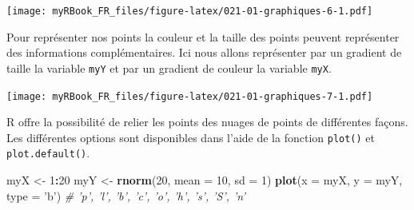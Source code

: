 \documentclass[]{book}
\newenvironment{Shaded}{\begin{snugshade}}{\end{snugshade}}
\newcommand{\CommentTok}[1]{\textcolor[rgb]{0.56,0.35,0.01}{\textit{#1}}}
\newcommand{\DataTypeTok}[1]{\textcolor[rgb]{0.13,0.29,0.53}{#1}}
\newcommand{\DecValTok}[1]{\textcolor[rgb]{0.00,0.00,0.81}{#1}}
\newcommand{\FloatTok}[1]{\textcolor[rgb]{0.00,0.00,0.81}{#1}}
\newcommand{\KeywordTok}[1]{\textcolor[rgb]{0.13,0.29,0.53}{\textbf{#1}}}
\newcommand{\NormalTok}[1]{#1}
\newcommand{\OperatorTok}[1]{\textcolor[rgb]{0.81,0.36,0.00}{\textbf{#1}}}
\newcommand{\StringTok}[1]{\textcolor[rgb]{0.31,0.60,0.02}{#1}}
\begin{document}
\texttt{[image: myRBook\_FR\_files/figure-latex/021-01-graphiques-6-1.pdf]}

Pour représenter nos points la couleur et la taille des points peuvent représenter des informations complémentaires. Ici nous allons représenter par un gradient de taille la variable \texttt{myY} et par un gradient de couleur la variable \texttt{myX}.

\begin{Shaded}
\end{Shaded}

\texttt{[image: myRBook\_FR\_files/figure-latex/021-01-graphiques-7-1.pdf]}

R offre la possibilité de relier les points des nuages de points de différentes façons. Les différentes options sont disponibles dans l'aide de la fonction \texttt{plot()} et \texttt{plot.default()}.

\begin{Shaded}
\begin{Highlighting}[]
\NormalTok{myX <-}\StringTok{ }\DecValTok{1}\OperatorTok{:}\DecValTok{20}
\NormalTok{myY <-}\StringTok{ }\KeywordTok{rnorm}\NormalTok{(}\DecValTok{20}\NormalTok{, }\DataTypeTok{mean =} \DecValTok{10}\NormalTok{, }\DataTypeTok{sd =} \DecValTok{1}\NormalTok{)}
\KeywordTok{plot}\NormalTok{(}\DataTypeTok{x =}\NormalTok{ myX, }\DataTypeTok{y =}\NormalTok{ myY, }
  \DataTypeTok{type =} \StringTok{'b'}\NormalTok{) }\CommentTok{# 'p', 'l', 'b', 'c', 'o', 'h', 's', 'S', 'n'}
\end{Highlighting}
\end{Shaded}
\end{document}

